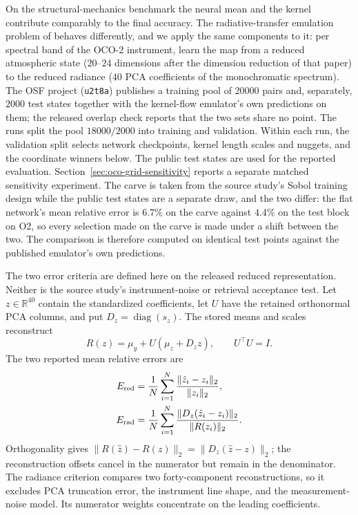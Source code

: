 On the structural-mechanics benchmark the neural mean and the kernel
contribute comparably to the final accuracy. The radiative-transfer emulation
problem of \citet{susiluoto2025radiative} behaves differently, and we apply
the same components to it: per
spectral band of the OCO-2 instrument, learn the map from a reduced
atmospheric state ($20$--$24$ dimensions after the dimension reduction of
that paper) to the reduced radiance ($40$ PCA coefficients of the
monochromatic spectrum). The OSF project (\texttt{u2t8a}) publishes a training
pool of $20000$ pairs and, separately, $2000$ test states together with the
kernel-flow emulator's own predictions on them; the released overlap check
reports that the two sets share no point. The runs split the pool
$18000/2000$ into training and validation. Within each run, the validation
split selects network checkpoints, kernel length scales and nuggets, and
the coordinate winners below. The public test states are used for the reported
evaluation. Section~\ref{sec:oco-grid-sensitivity} reports a separate
matched sensitivity experiment.
The carve is taken from the source study's Sobol training design while the
public test states are a separate draw, and the two differ: the flat
network's mean relative error is $6.7\%$ on the carve against $4.4\%$ on the
test block on O2, so every selection made on the carve is made under a shift between the two.
The comparison is therefore computed on identical test points against the published emulator's own predictions.

The two error criteria are defined here on the released reduced
representation. Neither is the source study's instrument-noise or retrieval
acceptance test. Let $z\in\mathbb R^{40}$ contain the standardized
coefficients, let $U$ have the retained orthonormal PCA columns, and put
$D_z=\operatorname{diag}(s_z)$. The stored means and scales reconstruct
\begin{equation}
 R(z)=\mu_y+U(\mu_z+D_z z),\qquad U^\top U=I.
 \label{eq:oco-reconstruction}
\end{equation}
The two reported mean relative errors are
\begin{align}
 E_{\rm red}&=\frac1N\sum_{i=1}^N
       \frac{\|\hat z_i-z_i\|_2}{\|z_i\|_2},
       \label{eq:oco-reduced}\\
 E_{\rm rad}&=\frac1N\sum_{i=1}^N
       \frac{\|D_z(\hat z_i-z_i)\|_2}{\|R(z_i)\|_2}.
       \label{eq:oco-radiance}
\end{align}
Orthogonality gives $\|R(\hat z)-R(z)\|_2
=\|D_z(\hat z-z)\|_2$; the reconstruction offsets cancel in the
numerator but remain in the denominator. The radiance criterion compares
two forty-component reconstructions, so it excludes PCA truncation error,
the instrument line shape, and the measurement-noise model. Its numerator
weights concentrate on the leading coefficients.

